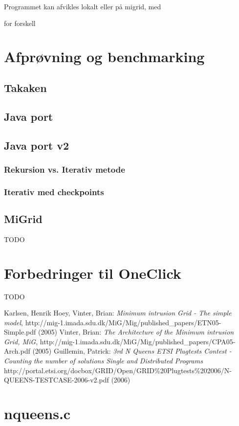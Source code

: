 \documentclass[a4,10pt]{article}
\begin{document}
Programmet kan afvikles lokalt eller på migrid, med 

for forskell

\section{Afprøvning og benchmarking}
\subsection{Takaken}
\subsection{Java port}
\subsection{Java port v2}
\subsubsection{Rekursion vs. Iterativ metode}
\subsubsection{Iterativ med checkpoints}
\subsection{MiGrid}

%
TODO
\section{Forbedringer til OneClick}
%
TODO


\begin{thebibliography}{99}
 Karlsen, Henrik Hoey, Vinter, Brian:
\emph{Minimum intrusion Grid - The simple model},
http://mig-1.imada.sdu.dk/MiG/Mig/published\_papers/ETN05-Simple.pdf (2005)
 Vinter, Brian:
\emph{The Architecture of the Minimum intrusion Grid, MiG},
http://mig-1.imada.sdu.dk/MiG/Mig/published\_papers/CPA05-Arch.pdf
(2005)
 Guillemin, Patrick:
\emph{3rd N Queens ETSI Plugtests Contest - Counting the number of
  solutions Single and Distributed Programs}
http://portal.etsi.org/docbox/GRID/Open/GRID\%20Plugtests\%202006/N-QUEENS-TESTCASE-2006-v2.pdf (2006)
\end{thebibliography}



\appendix
\section{nqueens.c}



%
\end{document}
